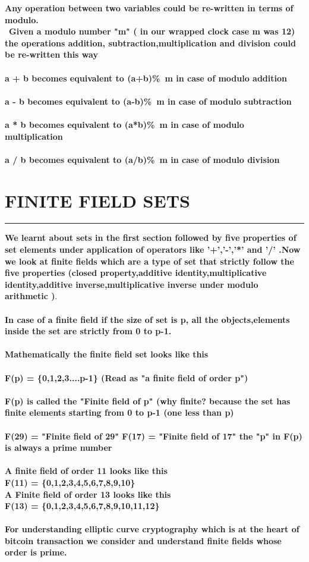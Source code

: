 \documentclass{article}
\begin{document}
\textbf {Any operation between two variables could be re-written in terms of modulo.}
\\
\
\textbf{Given a modulo number "m" ( in our wrapped clock case m was 12) the operations addition, subtraction,multiplication and division could be re-written this way}
\\
\\
\textbf{ a + b  becomes equivalent to (a+b)\%\ m in case of modulo addition}
\\
\\
\textbf { a - b becomes equivalent to (a-b)\%\ m in case of modulo subtraction }
\\
\\
\textbf { a * b becomes equivalent to (a*b)\%\ m in case of modulo multiplication}
\\
\\
\textbf { a / b becomes equivalent to (a/b)\%\ m in case of modulo division }

\pagebreak 
\section * {FINITE FIELD SETS}
\hrule
\bigskip
\textbf{ We learnt about sets in the first section followed by five  properties of set elements under application of operators like '+','-','*' and '/' .Now we look at finite fields which are a type of set that strictly follow the five properties (closed property,additive identity,multiplicative identity,additive inverse,multiplicative inverse under modulo arithmetic  )}.
\\
\\
\textbf{ In case of a finite field if the size of set is p, all the objects,elements inside the set are strictly from 0 to p-1.\\ \\ Mathematically the finite field set looks like this \\ \\
F(p) = \{0,1,2,3....p-1\} (Read as "a finite field of order  p")
\\ \\
F(p) is called the "Finite field of p" (why finite? because the set has finite elements starting from 0 to p-1 (one less than p)
\\\\ 
F(29) = "Finite field of 29"
F(17) = "Finite field of 17"
the "p" in F(p) is always a prime number 
\\ \\
A finite field of order 11 looks like this \\
F(11) = \{0,1,2,3,4,5,6,7,8,9,10\} \\
A Finite field of order 13 looks like this \\
F(13) = \{0,1,2,3,4,5,6,7,8,9,10,11,12\}
\\
\\
For understanding elliptic curve cryptography which is at the heart of bitcoin transaction we consider and understand finite fields whose order is prime.
}
\pagebreak 
\end{document}
